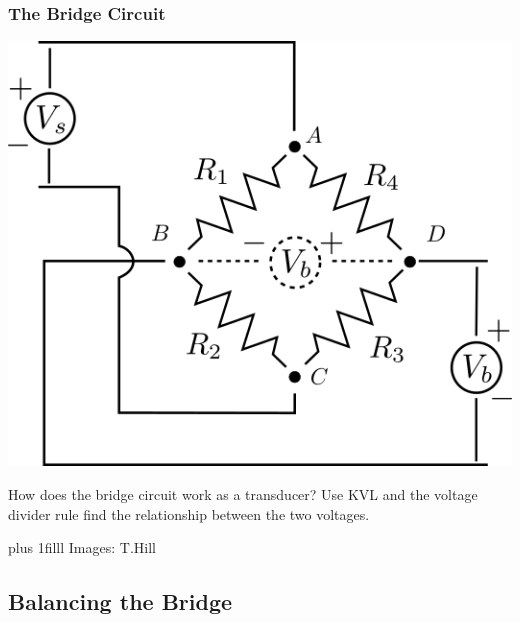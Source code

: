 \documentclass[fleqn]{beamer} %
\newcommand{\sectionIIsubsectionIItitle}{The Bridge Circuit}
\newcommand{\sectionIIsubsectionIIItitle}{Balancing the Bridge}
\newcommand{\btVFill}{\vskip0pt plus 1filll}
\begin{document}
			\begin{frame}
				\frametitle{\sectionIIsubsectionIItitle} \scriptsize
	
				\bigskip

				\begin{multicols}{2}

				\includegraphics[scale=.35]{images/bridge_circuit.png} \vspace{15mm} 

				How does the bridge circuit work as a transducer? \vspc Use KVL and the voltage divider rule find the relationship between the two voltages. \vspc


				\end{multicols}
				 
				\btVFill
				{\tiny Images: T.Hill}
				
			\end{frame}

		\subsection{\sectionIIsubsectionIIItitle}\label{sectionIIsubsectionIII}
\end{document}

